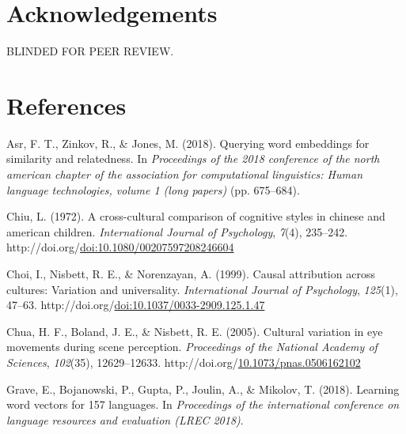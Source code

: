 \documentclass[10pt, letterpaper]{article}
\newenvironment{CSLReferences}%
  {}%
  {\par}
\begin{document}
\hypertarget{acknowledgements}{%
\section{Acknowledgements}\label{acknowledgements}}

BLINDED FOR PEER REVIEW.

\hypertarget{references}{%
\section{References}\label{references}}

\setlength{\parindent}{-0.1in} 
\setlength{\leftskip}{0.125in}

\noindent

\newpage

\hypertarget{refs}{}
\begin{CSLReferences}{1}{0}
\leavevmode{}%
Asr, F. T., Zinkov, R., \& Jones, M. (2018). Querying word embeddings
for similarity and relatedness. In \emph{Proceedings of the 2018
conference of the north american chapter of the association for
computational linguistics: Human language technologies, volume 1 (long
papers)} (pp. 675--684).

\leavevmode{}%
Chiu, L. (1972). A cross-cultural comparison of cognitive styles in
chinese and american children. \emph{International Journal of
Psychology}, \emph{7}(4), 235--242.
http://doi.org/\href{https://doi.org/doi:10.1080/00207597208246604}{doi:10.1080/00207597208246604}

\leavevmode{}%
Choi, I., Nisbett, R. E., \& Norenzayan, A. (1999). Causal attribution
across cultures: Variation and universality. \emph{International Journal
of Psychology}, \emph{125}(1), 47--63.
http://doi.org/\href{https://doi.org/doi:10.1037/0033-2909.125.1.47}{doi:10.1037/0033-2909.125.1.47}

\leavevmode{}%
Chua, H. F., Boland, J. E., \& Nisbett, R. E. (2005). Cultural variation
in eye movements during scene perception. \emph{Proceedings of the
National Academy of Sciences}, \emph{102}(35), 12629--12633.
http://doi.org/\href{https://doi.org/10.1073/pnas.0506162102}{10.1073/pnas.0506162102}

\leavevmode{}%
Grave, E., Bojanowski, P., Gupta, P., Joulin, A., \& Mikolov, T. (2018).
Learning word vectors for 157 languages. In \emph{Proceedings of the
international conference on language resources and evaluation (LREC
2018)}.


\end{CSLReferences}
\end{document}
